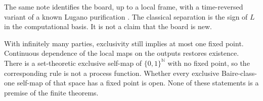 \documentclass[11pt]{article}
\begin{document}
The same note identifies the board, up to a local frame, with a time-reversed variant of a known Lugano purification \citep{guerin2018}. The classical separation is the sign of \(L\) in the computational basis. It is not a claim that the board is new.

With infinitely many parties, exclusivity still implies at most one fixed point. Continuous dependence of the local maps on the outputs restores existence. There is a set-theoretic exclusive self-map of \(\{0,1\}^{\mathbb{N}}\) with no fixed point, so the corresponding rule is not a process function. Whether every exclusive Baire-class-one self-map of that space has a fixed point is open. None of these statements is a premise of the finite theorems.



\end{document}

